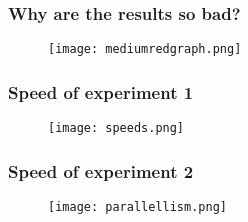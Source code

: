 \begin{frame}
\frametitle{Why are the results so bad?}
\begin{figure}

	\texttt{[image: mediumredgraph.png]}

\end{figure}
\end{frame}
\begin{frame}
\frametitle{Speed of experiment 1}
\begin{figure}

	\texttt{[image: speeds.png]}

\end{figure}
\end{frame}


\begin{frame}
\frametitle{Speed of experiment 2}
\begin{figure}

	\texttt{[image: parallellism.png]}

\end{figure}
\end{frame}

